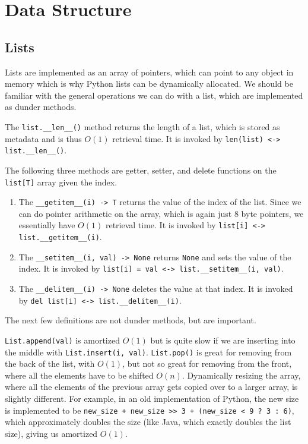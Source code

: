 \section{Data Structure}

\subsection{Lists}

  Lists are implemented as an array of pointers, which can point to any object in memory which is why Python lists can be dynamically allocated. We should be familiar with the general operations we can do with a list, which are implemented as dunder methods. 

  \begin{definition}[Length]
    The \texttt{list.\_\_len\_\_()} method returns the length of a list, which is stored as metadata and is thus $O(1)$ retrieval time. It is invoked by \texttt{len(list) <-> list.\_\_len\_\_()}. 
  \end{definition}

  \begin{definition}
    The following three methods are getter, setter, and delete functions on the \texttt{list[T]} array given the index. 
    \begin{enumerate}
      \item The \texttt{\_\_getitem\_\_(i) -> T} returns the value of the index of the list. Since we can do pointer arithmetic on the array, which is again just 8 byte pointers, we essentially have $O(1)$ retrieval time. It is invoked by \texttt{list[i] <-> list.\_\_getitem\_\_(i)}. 
      \item The \texttt{\_\_setitem\_\_(i, val) -> None} returns \texttt{None} and sets the value of the index. It is invoked by \texttt{list[i] = val <-> list.\_\_setitem\_\_(i, val)}. 
      \item The \texttt{\_\_delitem\_\_(i) -> None} deletes the value at that index. It is invoked by \texttt{del list[i] <-> list.\_\_delitem\_\_(i)}. 
    \end{enumerate}
  \end{definition}

  The next few definitions are not dunder methods, but are important. 
  \begin{definition}
    \texttt{List.append(val)} is amortized $O(1)$ but is quite slow if we are inserting into the middle with \texttt{List.insert(i, val)}. 
    \texttt{List.pop()} is great for removing from the back of the list, with $O(1)$, but not so great for removing from the front, where all the elements have to be shifted $O(n)$. 
    Dynamically resizing the array, where all the elements of the previous array gets copied over to a larger array, is slightly different. For example, in an old implementation of Python, the new size is implemented to be \texttt{new\_size + new\_size >> 3 + (new\_size < 9 ? 3 : 6)}, which approximately doubles the size (like Java, which exactly doubles the list size), giving us amortized $O(1)$. 
  \end{definition}

